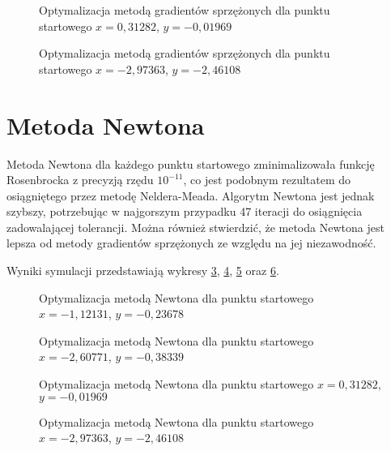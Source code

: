\begin{figure}
  \centering
  
  \caption{Optymalizacja metodą gradientów sprzężonych dla punktu startowego $x=0,31282$, $y=-0,01969$}
  \label{fig:cg_2}
\end{figure}

\begin{figure}
  \centering
  
  \caption{Optymalizacja metodą gradientów sprzężonych dla punktu startowego $x=-2,97363$, $y=-2,46108$}
  \label{fig:cg_3}
\end{figure}


\section{Metoda Newtona}
Metoda Newtona dla każdego punktu startowego zminimalizowała funkcję Rosenbrocka z precyzją rzędu $10^{-11}$, co jest podobnym rezultatem do osiągniętego przez metodę Neldera-Meada. Algorytm Newtona jest jednak szybszy, potrzebując w najgorszym przypadku 47 iteracji do osiągnięcia zadowalającej tolerancji. Można również stwierdzić, że metoda Newtona jest lepsza od metody gradientów sprzężonych ze względu na jej niezawodność. 

Wyniki symulacji przedstawiają wykresy \ref{fig:newton_0}, \ref{fig:newton_1}, \ref{fig:newton_2} oraz \ref{fig:newton_3}.

\begin{figure}
  \centering
  
  \caption{Optymalizacja metodą Newtona dla punktu startowego $x=-1,12131$, $y=-0,23678$}
  \label{fig:newton_0}
\end{figure}

\begin{figure}
  \centering
  
  \caption{Optymalizacja metodą Newtona dla punktu startowego $x=-2,60771$, $y=-0,38339$}
  \label{fig:newton_1}
\end{figure}

\begin{figure}
  \centering
  
  \caption{Optymalizacja metodą Newtona dla punktu startowego $x=0,31282$, $y=-0,01969$}
  \label{fig:newton_2}
\end{figure}

\begin{figure}
  \centering
  
  \caption{Optymalizacja metodą Newtona dla punktu startowego $x=-2,97363$, $y=-2,46108$}
  \label{fig:newton_3}
\end{figure}